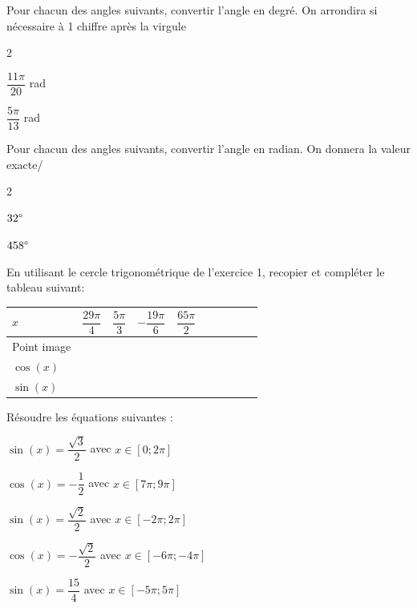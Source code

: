 \documentclass[11pt,a4paper]{article}  %
\begin{document}
Pour chacun des angles suivants, convertir l'angle en degré. On arrondira si nécessaire à 1 chiffre après la virgule
\begin{multicols}{2}
	\begin{enumMet}
		\item $\dfrac{11\pi}{20}$ rad
		\item $\dfrac{5\pi}{13}$ rad
	\end{enumMet}
\end{multicols}

Pour chacun des angles suivants, convertir l'angle en radian. On donnera la valeur exacte/
\begin{multicols}{2}
	\begin{enumMet}
		\item $32\degree$
		\item $458\degree$
	\end{enumMet}
\end{multicols}


En utilisant le cercle trigonométrique de l'exercice 1, recopier et compléter le tableau suivant:\\
\begin{center}
	\begin{tabular}{ | Xc | Xc | Xc | Xc | Xc | }
		\hline
		$x$  & $\dfrac{29\pi}{4}$ & $\dfrac{5\pi}{3}$ & $-\dfrac{19\pi}{6}$ &  $\dfrac{65\pi}{2}$ \\ \hline
		Point image  &   &   &   &   \\ \hline
		$\cos(x)$  &   &   &   &   \\ \hline
		$\sin(x)$ &   &   &   &   \\
		\hline  
	\end{tabular}
\end{center}


Résoudre les équations suivantes : 
\begin{enumMet}
	\item {} $\sin(x)=\dfrac{\sqrt{3}}{2}$ avec $x\in \left[0;2\pi\right]$
	\item $\cos(x)=-\dfrac{1}{2}$ avec $x\in \left[7\pi;9\pi\right]$
	\item $\sin(x)=\dfrac{\sqrt{2}}{2}$ avec $x\in \left[-2\pi;2\pi\right]$
	\item {} $\cos(x)=-\dfrac{\sqrt{2}}{2}$ avec $x\in \left[-6\pi;-4\pi\right]$
	\item $\sin(x)=\dfrac{15}{4}$ avec $x\in \left[-5\pi;5\pi\right]$
\end{enumMet}
\end{document}

